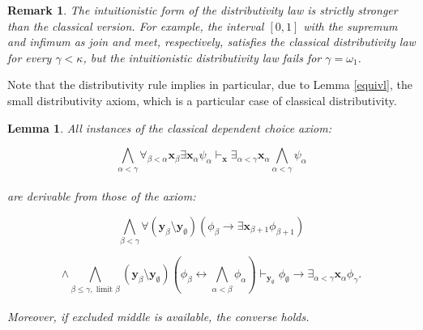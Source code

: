 \documentclass[a4paper,11pt]{article}
\theoremstyle{plain}
\newtheorem{lemma}[thm]{Lemma}
\newtheorem{rmk}[thm]{Remark}
\theoremstyle{plain}
\theoremstyle{remark}
\begin{document}
\begin{rmk}
 The intuitionistic form of the distributivity law is strictly stronger than the classical version. For example, the interval $[0, 1]$ with the supremum and infimum as join and meet, respectively, satisfies the classical distributivity law for every $\gamma<\kappa$, but the intuitionistic distributivity law fails for $\gamma=\omega_1$. 
\end{rmk}

Note that the distributivity rule implies in particular, due to Lemma \ref{equivl}, the small distributivity axiom, which is a particular case of classical distributivity. 

\begin{lemma}\label{equivl2}
All instances of the classical dependent choice axiom:

$$\bigwedge_{\alpha < \gamma} \forall_{\beta < \alpha}\mathbf{x}_{\beta} \exists \mathbf{x}_{\alpha} \psi_{\alpha} \vdash_{\mathbf{x}} \exists_{\alpha < \gamma} \mathbf{x}_{\alpha} \bigwedge_{\alpha < \gamma} \psi_{\alpha}$$
\\
are derivable from those of the axiom:

$$\bigwedge_{\beta < \gamma} \forall (\mathbf{y}_{\beta} \setminus \mathbf{y}_{\emptyset}) \left(\phi_{\beta} \to \exists \mathbf{x}_{\beta +1} \phi_{\beta +1} \right)$$

$$\wedge \bigwedge_{\beta \leq \gamma, \text{ limit }\beta} (\mathbf{y}_{\beta} \setminus \mathbf{y}_{\emptyset}) \left(\phi_{\beta} \leftrightarrow \bigwedge_{\alpha<\beta}\phi_{\alpha} \right) \vdash_{\mathbf{y}_{\emptyset}} \phi_{\emptyset} \to \exists_{\alpha < \gamma} \mathbf{x}_{\alpha} \phi_{\gamma}.$$
\\
Moreover, if excluded middle is available, the converse holds.

\end{lemma}
\end{document}

